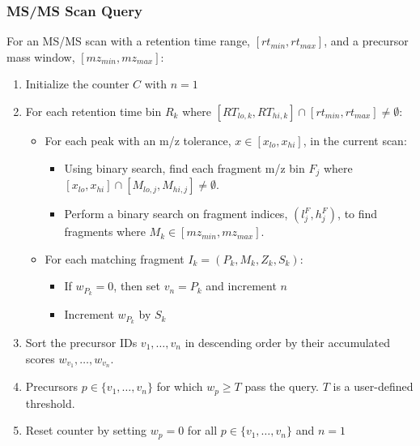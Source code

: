 \documentclass[pdflatex,sn-nature]{sn-jnl}
\begin{document}
\subsubsection{MS/MS Scan Query}
For an MS/MS scan with a retention time range, $[rt_{min}, rt_{max}]$, and a precursor mass window, $[mz_{min}, mz_{max}]$:
\begin{enumerate}
\item Initialize the counter $C$ with $n=1$
\item For each retention time bin $R_k$ where $[RT_{lo,k}, RT_{hi,k}] \cap [rt_{min}, rt_{max}] \neq \emptyset$:
    \begin{itemize}
        \item For each peak with an m/z tolerance, $x \in [x_{lo}, x_{hi}]$, in the current scan:
            \begin{itemize}
                \item Using binary search, find each fragment m/z bin $F_j$ where $[x_{lo}, x_{hi}] \cap [M_{lo,j}, M_{hi,j}] \neq \emptyset$.
                \item Perform a binary search on fragment indices, $(l_j^F, h_j^F)$, to find fragments where $M_k \in [mz_{min}, mz_{max}]$.
            \end{itemize}
        \item For each matching fragment $I_k = (P_k, M_k, Z_k, S_k)$:
            \begin{itemize}
                \item If $w_{P_k} = 0$, then set $v_n = P_k$ and increment $n$
                \item Increment $w_{P_k}$ by $S_k$
            \end{itemize}
    \end{itemize}

\item Sort the precursor IDs $v_1, \ldots, v_n$ in descending order by their accumulated scores $w_{v_1}, \ldots, w_{v_n}$.

\item Precursors $p \in \{v_1,\ldots,v_n\}$ for which $w_p \geq T$ pass the query. $T$ is a user-defined threshold. 

\item Reset counter by setting $w_p = 0$ for all $p \in \{v_1,\ldots,v_n\}$ and $n=1$
\end{enumerate}
\end{document}
